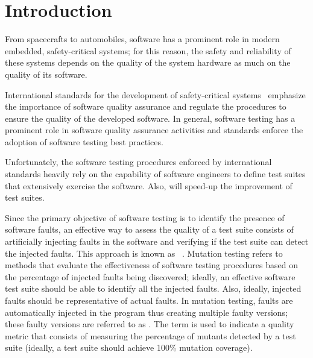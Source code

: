 
\chapter*{Introduction}
\label{sec:introduction}

From spacecrafts to automobiles, software has a prominent role in modern embedded, safety-critical systems; for this reason, the safety and reliability of these systems 
depends on the quality of the system hardware as much on the quality of its software.

International standards for the development of safety-critical systems~\cite{ecss40C,ecss80C,ISO26262} emphasize the importance of software quality assurance and regulate the procedures to ensure the quality of the developed software. In general, software testing has a prominent role in software quality assurance activities and standards enforce the adoption of software testing best practices.

Unfortunately, the software testing procedures enforced by international standards heavily rely on the capability of software engineers to define test suites that extensively exercise the software.  
Also,  will speed-up the improvement of test suites. 

Since the primary objective of software testing is to identify the presence of software faults, an effective way to assess the quality of a test suite consists of artificially injecting faults in the software and verifying if the test suite can detect the injected faults. 
This approach is known as ~\cite{DeMillo78}. Mutation testing refers to methods that evaluate the effectiveness of software testing procedures based on the percentage of injected faults being discovered; ideally, an effective software test suite should be able to identify all the injected faults. Also, ideally, injected faults should be representative of actual faults. 
In mutation testing, faults are automatically injected in the program thus creating multiple faulty versions; these faulty versions are referred to as .  The term  is used to indicate a quality metric that consists of measuring the percentage of mutants detected by a test suite (ideally, a test suite should achieve 100\% mutation coverage). 

